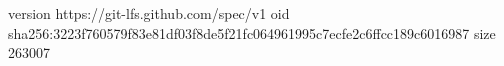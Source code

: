version https://git-lfs.github.com/spec/v1
oid sha256:3223f760579f83e81df03f8de5f21fc064961995c7ecfe2c6ffcc189c6016987
size 263007
